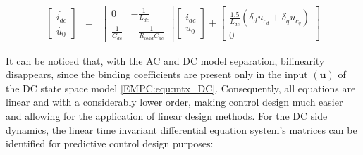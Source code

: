     \begin{equation}
        \begin{array}{rcl}
            \begin{bmatrix}
                \dot{i_{dc}}\\
                \dot{u_{0}}
            \end{bmatrix}&=&
            \begin{bmatrix}
                0&  -\frac{1}{L_{dc}}\\
                \frac{1}{C_{dc}}&   -\frac{1}{R_{load}C_{dc}}
            \end{bmatrix}
            \begin{bmatrix}
                i_{dc}\\
                u_0
            \end{bmatrix}+
            \begin{bmatrix}
                \frac{1.5}{L_{dc}}(\delta_du_{c_d}+\delta_qu_{c_q})\\
                0
            \end{bmatrix}
        \end{array}
        \label{EMPC:equ:mtx_DC}
    \end{equation}

    It can be noticed that, with the AC and DC model separation, bilinearity disappears, since the binding coefficients are present only in the input $(\textbf{u})$ of the DC state space model \ref{EMPC:equ:mtx_DC}. Consequently, all equations are linear and with a considerably lower order, making control design much easier and allowing for the application of linear design methods. For the DC side dynamics, the linear time invariant differential equation system’s matrices can be identified for predictive control design purposes:

